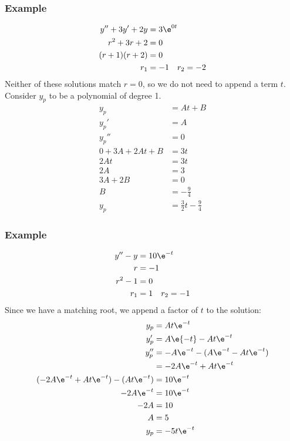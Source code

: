 \documentclass{math}
\begin{document}
\subsubsection*{Example}
\begin{align*}
  y''+3y'+2y &= 3\e^{0t} \\
  r^2+3r+2 &= 0 \\
  (r+1)(r+2) &= 0 \\
  r_1 &= -1 \quad r_2 = -2
\end{align*}
Neither of these solutions match \( r = 0 \), so we do not need to append a term
\( t \). Consider \( y_p \) to be a polynomial of degree 1.
\begin{align*}
  y_p &= At+B \\
  y_p' &= A \\
  y_p'' &= 0 \\
  0+3A+2At+B &= 3t \\
  2At &= 3t \\
  2A &= 3 \\
  3A+2B &= 0 \\
  B &= -\frac{9}{4} \\
  y_p &= \frac{3}{2}t-\frac{9}{4}
\end{align*}

\subsubsection*{Example}
\begin{align*}
  y''-y &= 10\e^{-t} \\
  r &= -1 \\
  r^2-1 &= 0 \\
  r_1 &= 1 \quad r_2 = -1
\end{align*}
Since we have a matching root, we append a factor of \( t \) to the solution:
\begin{align*}
  y_p &= At\e^{-t} \\
  y_p' &= A\e{-t}-At\e^{-t} \\
  y_p'' &= -A\e^{-t}-(A\e^{-t}-At\e^{-t}) \\
  &= -2A\e^{-t}+At\e^{-t} \\
  (-2A\e^{-t}+At\e^{-t})-(At\e^{-t}) &= 10\e^{-t} \\
  -2A\e^{-t} &= 10\e^{-t} \\
  -2A &= 10 \\
  A &= 5 \\
  y_p &= -5t\e^{-t}
\end{align*}
\end{document}
